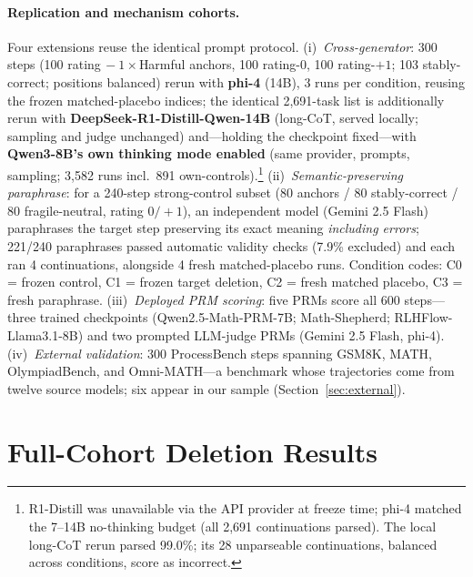 \documentclass[11pt]{article}
\begin{document}
\paragraph{Replication and mechanism cohorts.}
Four extensions reuse the identical prompt protocol. (i)~\emph{Cross-generator}: 300 steps (100 rating$\,-1\times$Harmful anchors, 100 rating-0, 100 rating-$+1$; 103 stably-correct; positions balanced) rerun with \textbf{phi-4} (14B), 3 runs per condition, reusing the frozen matched-placebo indices; the identical 2{,}691-task list is additionally rerun with \textbf{DeepSeek-R1-Distill-Qwen-14B} (long-CoT, served locally; sampling and judge unchanged) and---holding the checkpoint fixed---with \textbf{Qwen3-8B's own thinking mode enabled} (same provider, prompts, sampling; 3{,}582 runs incl.\ 891 own-controls).\footnote{R1-Distill was unavailable via the API provider at freeze time; phi-4 matched the 7--14B no-thinking budget (all 2{,}691 continuations parsed). The local long-CoT rerun parsed 99.0\%; its 28 unparseable continuations, balanced across conditions, score as incorrect.} (ii)~\emph{Semantic-preserving paraphrase}: for a 240-step strong-control subset (80 anchors / 80 stably-correct / 80 fragile-neutral, rating $0/{+}1$), an independent model (Gemini 2.5 Flash) paraphrases the target step preserving its exact meaning \emph{including errors}; 221/240 paraphrases passed automatic validity checks (7.9\% excluded) and each ran 4 continuations, alongside 4 fresh matched-placebo runs. Condition codes: C0 = frozen control, C1 = frozen target deletion, C2 = fresh matched placebo, C3 = fresh paraphrase. (iii)~\emph{Deployed PRM scoring}: five PRMs score all 600 steps---three trained checkpoints (Qwen2.5-Math-PRM-7B; Math-Shepherd; RLHFlow-Llama3.1-8B) and two prompted LLM-judge PRMs (Gemini 2.5 Flash, phi-4). (iv)~\emph{External validation}: 300 ProcessBench steps \citep{zheng2025processbench} spanning GSM8K, MATH, OlympiadBench, and Omni-MATH---a benchmark whose trajectories come from twelve source models; six appear in our sample (Section~\ref{sec:external}).

\section{Full-Cohort Deletion Results}
\label{sec:main}
\end{document}
